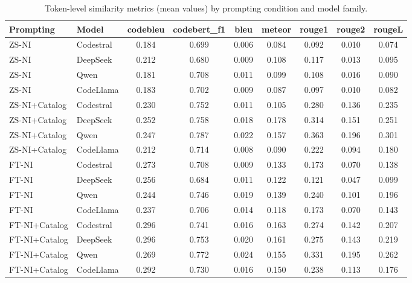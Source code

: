 \begin{table}
\caption{Token-level similarity metrics (mean values) by prompting condition and model family.}
\label{tab:token_metrics}
\begin{tabular}{llccccccc}
\toprule
Prompting & Model & codebleu & codebert_f1 & bleu & meteor & rouge1 & rouge2 & rougeL \\
\midrule
ZS-NI & Codestral & 0.184 & 0.699 & 0.006 & 0.084 & 0.092 & 0.010 & 0.074 \\
ZS-NI & DeepSeek & 0.212 & 0.680 & 0.009 & 0.108 & 0.117 & 0.013 & 0.095 \\
ZS-NI & Qwen & 0.181 & 0.708 & 0.011 & 0.099 & 0.108 & 0.016 & 0.090 \\
ZS-NI & CodeLlama & 0.183 & 0.702 & 0.009 & 0.087 & 0.097 & 0.010 & 0.082 \\
ZS-NI+Catalog & Codestral & 0.230 & 0.752 & 0.011 & 0.105 & 0.280 & 0.136 & 0.235 \\
ZS-NI+Catalog & DeepSeek & 0.252 & 0.758 & 0.018 & 0.178 & 0.314 & 0.151 & 0.251 \\
ZS-NI+Catalog & Qwen & 0.247 & 0.787 & 0.022 & 0.157 & 0.363 & 0.196 & 0.301 \\
ZS-NI+Catalog & CodeLlama & 0.212 & 0.714 & 0.008 & 0.090 & 0.222 & 0.094 & 0.180 \\
FT-NI & Codestral & 0.273 & 0.708 & 0.009 & 0.133 & 0.173 & 0.070 & 0.138 \\
FT-NI & DeepSeek & 0.256 & 0.684 & 0.011 & 0.122 & 0.121 & 0.047 & 0.099 \\
FT-NI & Qwen & 0.244 & 0.746 & 0.019 & 0.139 & 0.240 & 0.101 & 0.196 \\
FT-NI & CodeLlama & 0.237 & 0.706 & 0.014 & 0.118 & 0.173 & 0.070 & 0.143 \\
FT-NI+Catalog & Codestral & 0.296 & 0.741 & 0.016 & 0.163 & 0.274 & 0.142 & 0.207 \\
FT-NI+Catalog & DeepSeek & 0.296 & 0.753 & 0.020 & 0.161 & 0.275 & 0.143 & 0.219 \\
FT-NI+Catalog & Qwen & 0.269 & 0.772 & 0.024 & 0.155 & 0.331 & 0.195 & 0.262 \\
FT-NI+Catalog & CodeLlama & 0.292 & 0.730 & 0.016 & 0.150 & 0.238 & 0.113 & 0.176 \\
\bottomrule
\end{tabular}
\end{table}
